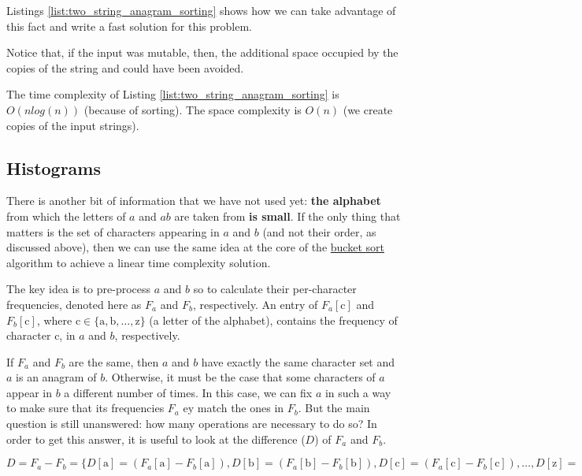 Listings \ref{list:two_string_anagram_sorting}  shows how we can take advantage of this fact and write a fast solution for this problem.



Notice that, if the input was mutable, then, the additional space occupied by the copies of the string  and  could have been avoided. 

The time complexity of Listing \ref{list:two_string_anagram_sorting}  is $O(n log(n))$ (because of sorting). The space complexity is $O(n)$ (we create copies of the input strings).



\subsection{Histograms}
\label{sec:anagrams:histograms}


There is another bit of information that we have not used yet: \textbf{the alphabet} from which the
letters of $a$ and $ab$ are taken from \textbf{is small}. 
If the only thing that matters is the set of characters appearing in $a$ and $b$ (and not their order, as discussed above),
then we can use the same idea at the core of the \href{https://en.wikipedia.org/wiki/Bucket_sort}{bucket sort} algorithm to achieve a linear time complexity solution.


The key idea is to pre-process $a$ and $b$ so to calculate their per-character frequencies, denoted here as $F_a$ and $F_b$, respectively.
An entry of $F_a[\mathrm{c}]$ and $F_b[\mathrm{c}]$, where $\mathrm{c} \in \{\mathrm{a},\mathrm{b},\ldots,\mathrm{z}\}$ (a letter of the alphabet), contains the frequency of character $\mathrm{c}$, in $a$ and $b$, respectively.


If $F_a$ and $F_b$ are the same, then $a$ and $b$ have exactly the same character set and $a$ is an anagram of $b$.
Otherwise, it must be the case that some characters of $a$ appear in $b$ a different number of times.
In this case, we can fix $a$ in such a way to make sure that its frequencies $F_a$ ey match the ones in $F_b$. 
But the main question is still unanswered: how many operations are necessary to do so?  In order to get this answer, it is useful to look at
the difference ($D$) of $F_a$ and $F_b$.

$D = F_a - F_b = \{D[\mathrm{a}] = (F_a[\mathrm{a}] - F_b[\mathrm{a}]), D[\mathrm{b}] = (F_a[\mathrm{b}] - F_b[\mathrm{b}]), D[\mathrm{c}] = (F_a[\mathrm{c}] - F_b[\mathrm{c}]), \ldots, D[\mathrm{z}] = (F_a[\mathrm{z}] - F_b[\mathrm{z}])\}
$

